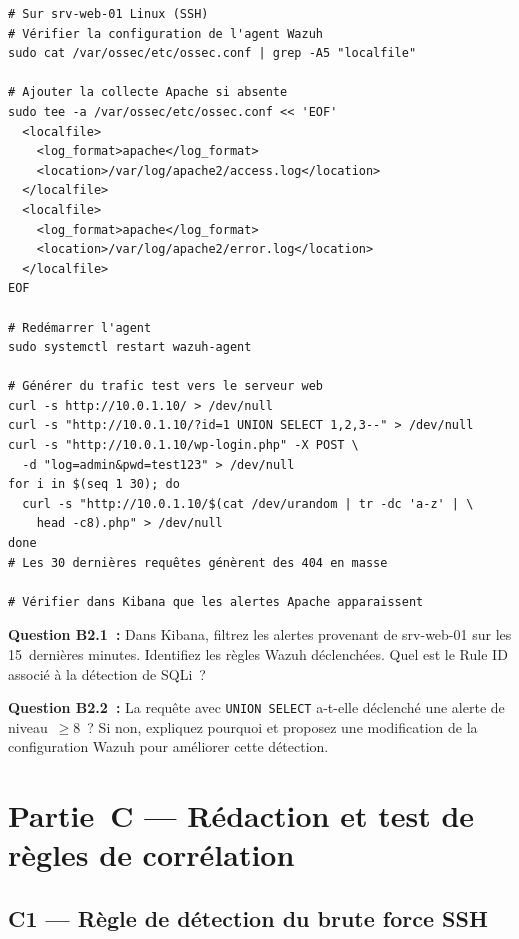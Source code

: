 \begin{lstlisting}[style=StyleTerminal,
  caption={Configuration de la collecte des logs Apache via Wazuh Agent},
  label={lst:lab1-apache}]
# Sur srv-web-01 Linux (SSH)
# Vérifier la configuration de l'agent Wazuh
sudo cat /var/ossec/etc/ossec.conf | grep -A5 "localfile"

# Ajouter la collecte Apache si absente
sudo tee -a /var/ossec/etc/ossec.conf << 'EOF'
  <localfile>
    <log_format>apache</log_format>
    <location>/var/log/apache2/access.log</location>
  </localfile>
  <localfile>
    <log_format>apache</log_format>
    <location>/var/log/apache2/error.log</location>
  </localfile>
EOF

# Redémarrer l'agent
sudo systemctl restart wazuh-agent

# Générer du trafic test vers le serveur web
curl -s http://10.0.1.10/ > /dev/null
curl -s "http://10.0.1.10/?id=1 UNION SELECT 1,2,3--" > /dev/null
curl -s "http://10.0.1.10/wp-login.php" -X POST \
  -d "log=admin&pwd=test123" > /dev/null
for i in $(seq 1 30); do
  curl -s "http://10.0.1.10/$(cat /dev/urandom | tr -dc 'a-z' | \
    head -c8).php" > /dev/null
done
# Les 30 dernières requêtes génèrent des 404 en masse

# Vérifier dans Kibana que les alertes Apache apparaissent
\end{lstlisting}

\begin{boxexo}
\textbf{Question B2.1~:} Dans Kibana, filtrez les alertes provenant de
srv-web-01 sur les 15~dernières minutes. Identifiez les règles Wazuh
déclenchées. Quel est le Rule ID associé à la détection de SQLi~?

\medskip\textbf{Question B2.2~:} La requête avec \texttt{UNION SELECT}
a-t-elle déclenché une alerte de niveau~$\geq 8$~? Si non, expliquez
pourquoi et proposez une modification de la configuration Wazuh pour
améliorer cette détection.
\end{boxexo}


\section{Partie~C — Rédaction et test de règles de corrélation}
\label{lab1:partieC}

\subsection{C1 — Règle de détection du brute force SSH}

